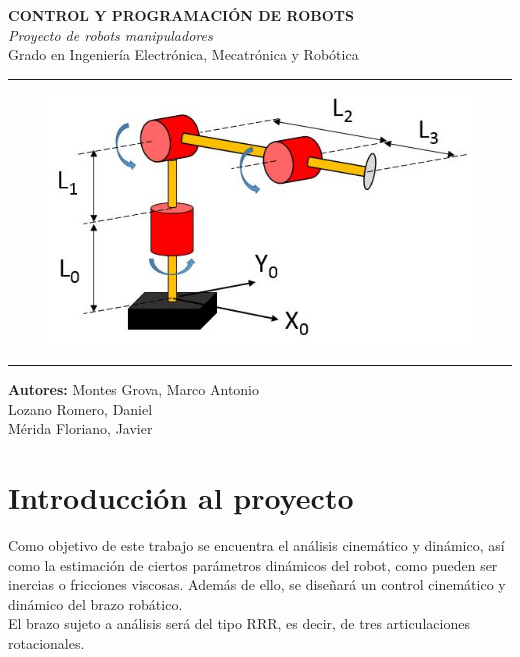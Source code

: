\documentclass[a4paper,twoside]{article}
\begin{document}
\begin{titlepage}
	\centering
\Huge{\textbf{CONTROL Y PROGRAMACIÓN DE ROBOTS}} \\
\Huge{\textit{Proyecto de robots manipuladores}}\\

\vspace{1cm}
\LARGE{Grado en Ingeniería Electrónica, Mecatrónica y Robótica}\\
\rule{\textwidth}{0.1mm}
\begin{figure}[h!]
	\centering
	\includegraphics[width=1\textwidth]{brazo_portada}
\end{figure}
\vspace{3cm}
\rule{\textwidth}{0.1mm}
\Large{\textbf{Autores:} Montes Grova, Marco Antonio\\
 Lozano Romero, Daniel\\
 Mérida Floriano, Javier}
\end{titlepage}
\tableofcontents
\newpage
\section{Introducción al proyecto}
	Como objetivo de este trabajo se encuentra el análisis cinemático y dinámico, así como la estimación de ciertos parámetros dinámicos del robot, como pueden ser inercias o fricciones viscosas. Además de ello, se diseñará un control cinemático y dinámico del brazo robático.\\
	El brazo sujeto a análisis será del tipo RRR, es decir, de tres articulaciones rotacionales.
\end{document}
